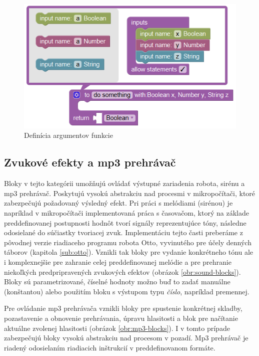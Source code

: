 \vspace{3cm}

\begin{figure}[bh!]
\centerline{\includegraphics[]{images/function-definition}}
\caption[Definícia argumentov funkcie]{Definícia argumentov funkcie}
\label{obr:function-definition}
\end{figure}


\newpage

\subsection{Zvukové efekty a mp3 prehrávač}
Bloky v tejto kategórii umožňujú ovládať výstupné zariadenia robota, sirénu a mp3 prehrávač. Poskytujú vysokú abstrakciu nad procesmi v mikropočítači, ktoré zabezpečujú požadovaný výsledný efekt. Pri práci s melódiami (sirénou) je napríklad v mikropočítači implementovaná práca s časovačom, ktorý na základe preddefinovanej postupnosti hodnôt tvorí signály reprezentujúce tóny, následne odosielané do súčiastky tvoriacej zvuk. Implementáciu tejto časti preberáme z pôvodnej verzie riadiaceho programu robota Otto, vyvinutého pre účely denných táborov (kapitola \ref{sub:otto}). Vznikli tak bloky pre vydanie konkrétneho tónu ale i komplexnejšie pre zahranie celej preddefinovanej melódie a pre prehranie niekoľkých predpripravených zvukových efektov (obrázok \ref{obr:sound-blocks}). Bloky sú parametrizované, číselné hodnoty možno buď to zadať manuálne (konštantou) alebo použitím bloku s výstupom typu \textit{číslo}, napríklad premennej.

Pre ovládanie mp3 prehrávača vznikli bloky pre spustenie konkrétnej skladby, pozastavenie a obnovenie prehrávania, úpravu hlasitosti a blok pre načítanie aktuálne zvolenej hlasitosti (obrázok \ref{obr:mp3-blocks}). I v tomto prípade zabezpečujú bloky vysokú abstrakciu nad procesom v pozadí. Mp3 prehrávač je riadený odosielaním riadiacich inštrukcií v preddefinovanom formáte.


